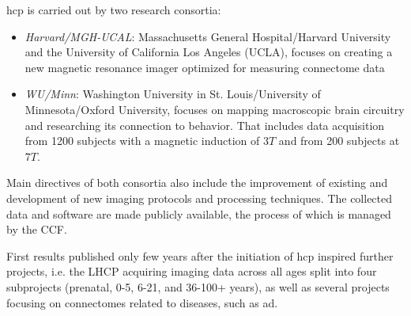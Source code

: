 \documentclass[plainreport]{cgvpub}
\newcommand{\newcite}[1]{\textsuperscript{\cite{#1}}}
\begin{document}
	\acrshort{hcp} is carried out by two research consortia:
	\begin{itemize}
		\item \emph{Harvard/MGH-UCAL}: Massachusetts General Hospital/Harvard University and the University of California Los Angeles (UCLA), focuses on creating a new magnetic resonance imager optimized for measuring connectome data
		\item \emph{WU/Minn}: Washington University in St. Louis/University of Minnesota/Oxford University, focuses on mapping macroscopic brain circuitry and researching its connection to behavior. That includes data acquisition from 1200 subjects with a magnetic induction of $ 3T $ and from 200 subjects at $ 7T $\newcite{wuminn}. 
	\end{itemize}
	Main directives of both consortia also include the improvement of existing and development of new imaging protocols and processing techniques. The collected data and software are made publicly available, the process of which is managed by the \Gls{CCF}. 
	
	First results published only few years after the initiation of \acrshort{hcp} inspired further projects, i.e. the \Gls{LHCP} acquiring imaging data across all ages split into four subprojects (prenatal, 0-5, 6-21, and 36-100+ years), as well as several projects focusing on connectomes related to diseases, such as \acrshort{ad}.

	\printglossary[type=gloss_terms]
	\printglossary[type=gloss_acr]
	\nocite{*}
	
	
\end{document}
